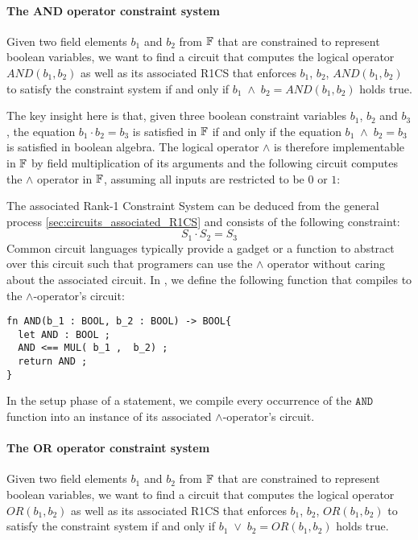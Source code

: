 \paragraph{The AND operator constraint system} Given two field elements $b_1$ and $b_2$ from $\mathbb{F}$ that are constrained to represent boolean variables, we want to find a circuit that computes the logical  operator $AND(b_1,b_2)$ as well as its associated R1CS that enforces $b_1$, $b_2$, $AND(b_1,b_2)$ to satisfy the constraint system if and only if $b_1\; \wedge \; b_2 =AND(b_1,b_2)$ holds true. 

The key insight here is that, given three boolean constraint variables $b_1$, $b_2$ and $b_3$, the equation $b_1\cdot b_2 = b_3$ is satisfied in $\mathbb{F}$ if and only if the equation $b_1\; \wedge \; b_2 = b_3$ is satisfied in boolean algebra. The logical operator $\wedge$ is therefore implementable in $\mathbb{F}$ by field multiplication of its arguments and the following circuit computes the $\wedge$ operator in $\mathbb{F}$, assuming all inputs are restricted to be $0$ or $1$:
\begin{center}
\end{center}
The associated Rank-1 Constraint System can be deduced from the general process \ref{sec:circuits_associated_R1CS} and consists of the following constraint:
\begin{equation}
 S_1 \cdot S_2 = S_3
\end{equation}
Common circuit languages typically provide a gadget or a function to abstract over this circuit such that programers can use the $\wedge$ operator without caring about the associated circuit. In , we define the following function that compiles to the $\wedge$-operator's circuit:
\begin{lstlisting}
fn AND(b_1 : BOOL, b_2 : BOOL) -> BOOL{
  let AND : BOOL ; 
  AND <== MUL( b_1 ,  b_2) ;
  return AND ;
}
\end{lstlisting}
In the setup phase of a statement, we compile every occurrence of the $\mathtt{AND}$ function into an instance of its associated $\wedge$-operator's circuit.
\paragraph{The OR operator constraint system}
\label{def:boolean-or} Given two field elements $b_1$ and $b_2$ from $\mathbb{F}$ that are constrained to represent boolean variables, we want to find a circuit that computes the logical  operator $OR(b_1,b_2)$ as well as its associated R1CS that enforces $b_1$, $b_2$, $OR(b_1,b_2)$ to satisfy the constraint system if and only if $b_1\; \vee \; b_2 = OR(b_1,b_2)$ holds true. 

